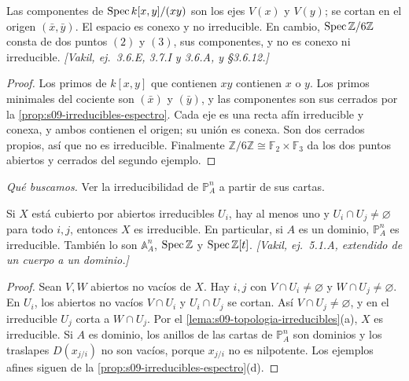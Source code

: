 \begin{ejem}
\label{ejem:s09-dos-ejes}
Las componentes de $\operatorname{Spec} k[x,y]/(xy)$ son los ejes $V(x)$ y $V(y)$; se cortan en el origen $(\bar x,\bar y)$. El espacio es conexo y no irreducible. En cambio, $\operatorname{Spec}\mathbb Z/6\mathbb Z$ consta de dos puntos $(2)$ y $(3)$, sus componentes, y no es conexo ni irreducible. \emph{[Vakil, ej.~3.6.E, 3.7.I y 3.6.A, y \S3.6.12.]}
\end{ejem}
\begin{proof}
Los primos de $k[x,y]$ que contienen $xy$ contienen $x$ o $y$. Los primos minimales del cociente son $(\bar x)$ y $(\bar y)$, y las componentes son sus cerrados por la \cref{prop:s09-irreducibles-espectro}. Cada eje es una recta afín irreducible y conexa, y ambos contienen el origen; su unión es conexa. Son dos cerrados propios, así que no es irreducible. Finalmente $\mathbb Z/6\mathbb Z\cong\mathbb F_2\times\mathbb F_3$ da los dos puntos abiertos y cerrados del segundo ejemplo.
\end{proof}

\begin{center}
\end{center}

\emph{Qué buscamos.} Ver la irreducibilidad de $\mathbb P^n_A$ a partir de sus cartas.

\begin{lema}
\label{lema:s09-pegado-irreducibles}
Si $X$ está cubierto por abiertos irreducibles $U_i$, hay al menos uno y $U_i\cap U_j\ne\varnothing$ para todo $i,j$, entonces $X$ es irreducible. En particular, si $A$ es un dominio, $\mathbb P^n_A$ es irreducible. También lo son $\mathbb A^n_A$, $\operatorname{Spec}\mathbb Z$ y $\operatorname{Spec}\mathbb Z[t]$. \emph{[Vakil, ej.~5.1.A, extendido de un cuerpo a un dominio.]}
\end{lema}
\begin{proof}
Sean $V,W$ abiertos no vacíos de $X$. Hay $i,j$ con $V\cap U_i\ne\varnothing$ y $W\cap U_j\ne\varnothing$. En $U_i$, los abiertos no vacíos $V\cap U_i$ y $U_i\cap U_j$ se cortan. Así $V\cap U_j\ne\varnothing$, y en el irreducible $U_j$ corta a $W\cap U_j$. Por el \cref{lema:s09-topologia-irreducibles}(a), $X$ es irreducible. Si $A$ es dominio, los anillos de las cartas de $\mathbb P^n_A$ son dominios y los traslapes $D(x_{j/i})$ no son vacíos, porque $x_{j/i}$ no es nilpotente. Los ejemplos afines siguen de la \cref{prop:s09-irreducibles-espectro}(d).
\end{proof}

